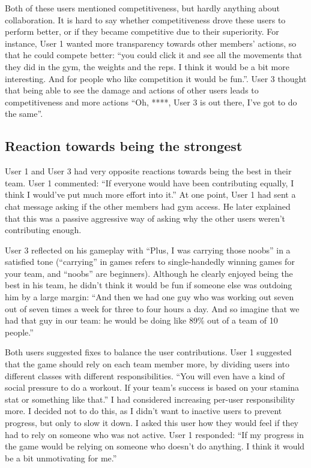 \documentclass{l4proj}
\begin{document}
Both of these users mentioned competitiveness, but hardly anything about collaboration. It is hard to say whether competitiveness drove these users to perform better, or if they became competitive due to their superiority. For instance, User 1 wanted more transparency towards other members' actions, so that he could compete better: ``you could click it and see all the movements that they did in the gym, the weights and the reps. I think it would be a bit more interesting. And for people who like competition it would be fun.''. User 3 thought that being able to see the damage and actions of other users leads to competitiveness and more actions ``Oh, ****, User 3 is out there, I've got to do the same''. 

\subsection{Reaction towards being the strongest}

User 1 and User 3 had very opposite reactions towards being the best in their team. User 1 commented: ``If everyone would have been contributing equally, I think I would've put much more effort into it.'' At one point, User 1 had sent a chat message asking if the other members had gym access. He later explained that this was a passive aggressive way of asking why the other users weren't contributing enough. 

User 3 reflected on his gameplay with ``Plus, I was carrying those noobs'' in a satisfied tone (``carrying'' in games refers to single-handedly winning games for your team, and ``noobs'' are beginners). Although he clearly enjoyed being the best in his team, he didn't think it would be fun if someone else was outdoing him by a large margin: ``And then we had one guy who was working out seven out of seven times a week for three to four hours a day. And so imagine that we had that guy in our team: he would be doing like 89\% out of a team of 10 people.'' 

Both users suggested fixes to balance the user contributions. User 1 suggested that the game should rely on each team member more, by dividing users into different classes with different responsibilities. ``You will even have a kind of social pressure to do a workout. If your team's success is based on your stamina stat or something like that.'' I had considered increasing per-user responsibility more. I decided not to do this, as I didn't want to inactive users to prevent progress, but only to slow it down. I asked this user how they would feel if they had to rely on someone who was not active. User 1 responded: ``If my progress in the game would be relying on someone who doesn't do anything. I think it would be a bit unmotivating for me.'' 
\end{document}
